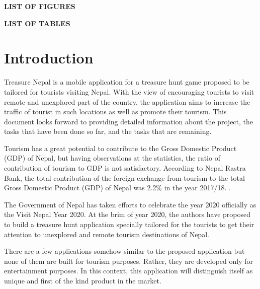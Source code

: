 \documentclass[12pt, a4paper, oneside]{article}
\begin{document}
\normalsize
\setlength{\cftbeforetoctitleskip}{0pt}
\renewcommand{\contentsname}{}
\tableofcontents

\break

\large
{}
\begin{center}
	\textbf{LIST OF FIGURES}
\end{center}
\renewcommand{\listfigurename}{}

\listoffigures

\break

\large
{}
\begin{center}
	\textbf{LIST OF TABLES}
\end{center}
\renewcommand{\listtablename}{}

\listoftables

\break

\cfoot{\textbf{\thepage} /  \pageref{LastPage}}

\section{Introduction} 
Treasure Nepal is a mobile application for a treasure hunt game proposed to be tailored for tourists visiting Nepal. With the view of encouraging tourists to visit remote and unexplored part of the country, the application aims to increase the traffic of tourist in such locations as well as promote their tourism. This document looks forward to providing detailed information about the project, the tasks that have been done so far, and the tasks that are remaining.

Tourism has a great potential to contribute to the Gross Domestic Product (GDP) of Nepal, but having observations at the statistics, the ratio of contribution of tourism to GDP is not satisfactory. According to Nepal Rastra Bank, the total contribution of the foreign exchange from tourism to the total Gross Domestic Product (GDP) of Nepal was 2.2\% in the year 2017/18. \cite{tourismstats}.

The Government of Nepal has taken efforts to celebrate the year 2020 officially as the Visit Nepal Year 2020. At the brim of year 2020, the authors have proposed to build a treasure hunt application specially tailored for the tourists to get their attention to unexplored and remote tourism destinations of Nepal. 

There are a few applications somehow similar to the proposed application but none of them are built for tourism purposes. Rather, they are developed only for entertainment purposes. In this context, this application will distinguish itself as unique and first of the kind product in the market.
\end{document}
